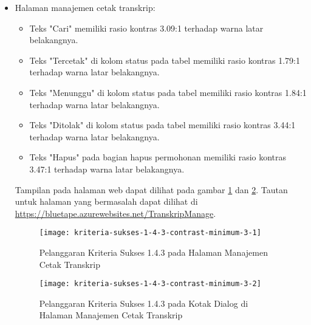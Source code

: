 \begin{itemize}
    \item Halaman manajemen cetak transkrip: 
    \begin{itemize}
        \item Teks "Cari" memiliki rasio kontras 3.09:1 terhadap warna latar belakangnya.
        \item Teks "Tercetak" di kolom status pada tabel memiliki rasio kontras 1.79:1 terhadap warna latar belakangnya.
        \item Teks "Menunggu" di kolom status pada tabel memiliki rasio kontras 1.84:1 terhadap warna latar belakangnya.
        \item Teks "Ditolak" di kolom status pada tabel memiliki rasio kontras 3.44:1 terhadap warna latar belakangnya.
        \item Teks "Hapus" pada bagian hapus permohonan memiliki rasio kontras 3.47:1 terhadap warna latar belakangnya.
    \end{itemize}
    Tampilan pada halaman web dapat dilihat pada gambar \ref{fig:1.4.3_contrast_minimum_3_1} dan \ref{fig:1.4.3_contrast_minimum_3_2}. Tautan untuk halaman yang bermasalah dapat dilihat di \url{https://bluetape.azurewebsites.net/TranskripManage}.
    \begin{figure}[H]
        \centering  
        \texttt{[image: kriteria-sukses-1-4-3-contrast-minimum-3-1]}  
        \caption[Pelanggaran Kriteria Sukses 1.4.3 pada Halaman Manajemen Cetak Transkrip]{Pelanggaran Kriteria Sukses 1.4.3 pada Halaman Manajemen Cetak Transkrip}
        \label{fig:1.4.3_contrast_minimum_3_1}
    \end{figure} 
    
    \begin{figure}[H]
        \centering  
        \texttt{[image: kriteria-sukses-1-4-3-contrast-minimum-3-2]}  
        \caption[Pelanggaran Kriteria Sukses 1.4.3 pada Kotak Dialog di Halaman Manajemen Cetak Transkrip]{Pelanggaran Kriteria Sukses 1.4.3 pada Kotak Dialog di Halaman Manajemen Cetak Transkrip}
        \label{fig:1.4.3_contrast_minimum_3_2}
    \end{figure} 


\end{itemize}
